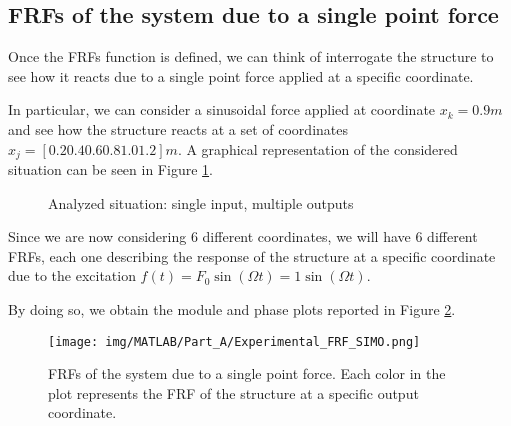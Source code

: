 \subsection{FRFs of the system due to a single point force}
\label{subsec:FRFs_of_the_system_due_to_a_single_point_force}

Once the FRFs function is defined, we can think of interrogate the structure to see how it reacts due to a single point force applied at a specific coordinate.

In particular, we can consider a sinusoidal force applied at coordinate $x_k = 0.9m$ and see how the structure reacts at a set of coordinates $x_j = [0.2 0.4 0.6 0.8 1.0 1.2]m$.
A graphical representation of the considered situation can be seen in Figure \ref{fig:beam_single_point_force}.

\begin{figure}[H]
    \centering
    \caption{Analyzed situation: single input, multiple outputs}
    \label{fig:beam_single_point_force}
\end{figure}

Since we are now considering $6$ different coordinates, we will have $6$ different FRFs, each one describing the response of the structure at a specific coordinate due to the excitation $f(t) = F_0 \sin(\Omega t) = 1 \sin(\Omega t)$.

By doing so, we obtain the module and phase plots reported in Figure \ref{fig:FRFs_single_point_force}.

\begin{figure}[H]
    \centering
    \texttt{[image: img/MATLAB/Part\_A/Experimental\_FRF\_SIMO.png]}
    \caption{FRFs of the system due to a single point force. Each color in the plot represents the FRF of the structure at a specific output coordinate.}
    \label{fig:FRFs_single_point_force}
\end{figure}
